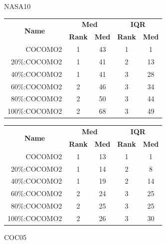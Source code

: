 \documentclass[final,twocolumn]{elsarticle}
\theoremstyle{break}
\begin{document}
\begin{figure}[!t]
\begin{center}
\caption{NASA10}
\scriptsize
\label{fig:nasa10}
\begin{tabular}{|r|c|c|c|c|}
\hline
\multicolumn{1}{|c|}{\multirow{2}{*}{\textbf{Name}}} & \multicolumn{2}{c|}{\textbf{Med}}     & \multicolumn{2}{c|}{\textbf{IQR}} \\ \cline{2-5} 
\multicolumn{1}{|c|}{}                               & \textbf{Rank} & \textbf{Med} & \textbf{Rank} & \textbf{Med} \\ \hline
    COCOMO2  & 1 & 43  & 1    & 1     \\ \cline{4-5}
20\%:COCOMO2 & 1 & 41   & 2    & 13   \\ \cline{4-5}
40\%:COCOMO2 & 1 & 41   & 3    & 28   \\ \cline{2-3}
60\%:COCOMO2 & 2 & 46   & 3    & 34   \\ 
80\%:COCOMO2 & 2 & 50  & 3    & 44  \\
100\%:COCOMO2 & 2 & 68  & 3    & 49    \\ \hline         
\end{tabular}


\caption{COC05}
\scriptsize
\label{fig:coc05}
\begin{tabular}{|r|c|c|c|c|}
\hline
\multicolumn{1}{|c|}{\multirow{2}{*}{\textbf{Name}}} & \multicolumn{2}{c|}{\textbf{Med}}     & \multicolumn{2}{c|}{\textbf{IQR}} \\ \cline{2-5} 
\multicolumn{1}{|c|}{}                               & \textbf{Rank} & \textbf{Med} & \textbf{Rank} & \textbf{Med} \\ \hline
    COCOMO2  & 1 & 13   & 1    & 1     \\ \cline{4-5}
20\%:COCOMO2 & 1 & 14   & 2    & 8    \\ 
40\%:COCOMO2 & 1 & 19   & 2    & 14    \\ \cline{2-5}
60\%:COCOMO2 & 2 & 24   & 3    & 25   \\ 
80\%:COCOMO2 & 2 & 25   & 3    & 25   \\
100\%:COCOMO2 & 2 & 26  & 3    & 30     \\ \hline    
\end{tabular}


\end{center}
\end{figure}
\end{document}
